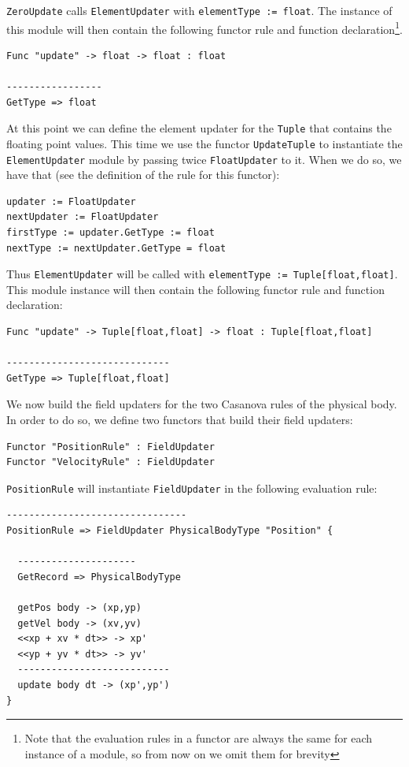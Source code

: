 \noindent
\texttt{ZeroUpdate} calls \texttt{ElementUpdater} with \texttt{elementType := float}. The instance of this module will then contain the following functor rule and function declaration\footnote{Note that the evaluation rules in a functor are always the same for each instance of a module, so from now on we omit them for brevity}.

\begin{lstlisting}
Func "update" -> float -> float : float

-----------------
GetType => float
\end{lstlisting}

\noindent
At this point we can define the element updater for the \texttt{Tuple} that contains the floating point values. This time we use the functor \texttt{UpdateTuple} to instantiate the \texttt{ElementUpdater} module by passing twice \texttt{FloatUpdater} to it. When we do so, we have that (see the definition of the rule for this functor):

\begin{lstlisting}
updater := FloatUpdater
nextUpdater := FloatUpdater
firstType := updater.GetType := float
nextType := nextUpdater.GetType = float
\end{lstlisting}

\noindent
Thus \texttt{ElementUpdater} will be called with \texttt{elementType := Tuple[float,float]}. This module instance will then contain the following functor rule and function declaration:

\begin{lstlisting}
Func "update" -> Tuple[float,float] -> float : Tuple[float,float]

-----------------------------
GetType => Tuple[float,float]
\end{lstlisting}

\noindent
We now build the field updaters for the two Casanova rules of the physical body. In order to do so, we define two functors that build their field updaters:

\begin{lstlisting}
Functor "PositionRule" : FieldUpdater
Functor "VelocityRule" : FieldUpdater
\end{lstlisting}

\noindent
\texttt{PositionRule} will instantiate \texttt{FieldUpdater} in the following evaluation rule:

\begin{lstlisting}
--------------------------------
PositionRule => FieldUpdater PhysicalBodyType "Position" {

  ---------------------
  GetRecord => PhysicalBodyType

  getPos body -> (xp,yp)
  getVel body -> (xv,yv)
  <<xp + xv * dt>> -> xp'
  <<yp + yv * dt>> -> yv'
  ---------------------------
  update body dt -> (xp',yp')
}
\end{lstlisting}

